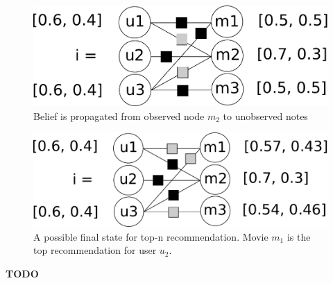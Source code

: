 \begin{figure}[h]\centering
    \includegraphics[scale=0.33]{graphics/top-n-important-messages.pdf}
  \caption{Belief is propagated from observed node $m_2$ to unobserved notes \label{top_n_graph_important_msg}}
\end{figure}

\begin{figure}[h]\centering
    \includegraphics[scale=0.33]{graphics/top-n-final.pdf}
  \caption{A possible final state for top-n recommendation. Movie $m_1$ is the top recommendation for user $u_2$. \label{top_n_graph_final_state}}
\end{figure}


\textbf{TODO}

%
%
%
